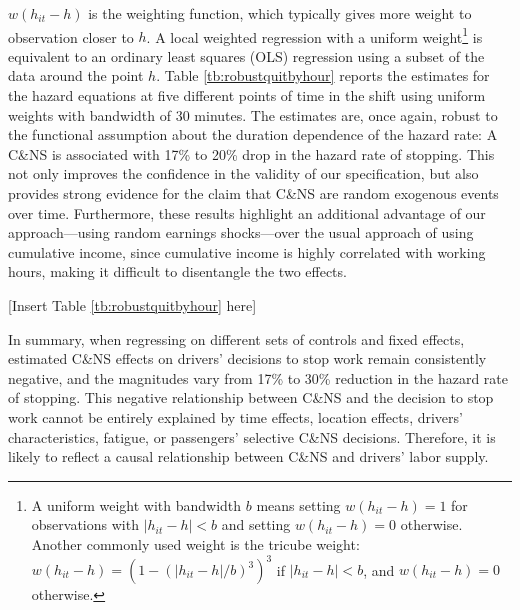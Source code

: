 \documentclass[reviewmode,AEJ]{AEA}
\begin{document}
$w(h_{it}-h)$ is the weighting function, which typically gives more weight to observation closer to $h$. A local weighted regression with a uniform weight\footnote{A uniform weight with bandwidth $b$ means setting $w(h_{it}-h) = 1$ for observations with $|h_{it}-h|<b$ and setting $w(h_{it}-h) = 0$ otherwise. Another commonly used weight is the tricube weight: $w(h_{it}-h) = \left(1-(|h_{it}-h|/b)^3\right)^3$ if $|h_{it}-h|<b$, and $w(h_{it}-h) = 0$ otherwise.} is equivalent to an ordinary least squares (OLS) regression using a subset of the data around the point $h$. Table \ref{tb:robustquitbyhour} reports the estimates for the hazard equations at five different points of time in the shift using uniform weights with bandwidth of 30 minutes. The estimates are, once again, robust to the functional assumption about the duration dependence of the hazard rate: A C\&NS is associated with 17\% to 20\% drop in the hazard rate of stopping.  This not only improves the confidence in the validity of our specification, but also provides strong evidence for the claim that C\&NS are random exogenous events over time. Furthermore, these results highlight an additional advantage of our approach---using random earnings 
shocks---over the usual approach of using cumulative income, since cumulative income is highly correlated
with working hours, making it difficult to disentangle the two effects.  



\begin{center}
	[Insert Table \ref{tb:robustquitbyhour} here]
\end{center}


In summary, when regressing on different sets of controls and fixed effects, estimated C\&NS effects on
drivers' decisions to stop work remain consistently negative, and the magnitudes vary
from 17\% to 30\% reduction in the hazard rate of stopping. This negative relationship between C\&NS and the decision to stop work cannot
be entirely explained by time effects, location effects, drivers' characteristics, fatigue, or passengers' 
selective C\&NS decisions. Therefore, it is likely to reflect a causal relationship between C\&NS and 
drivers' labor supply.
\end{document}

